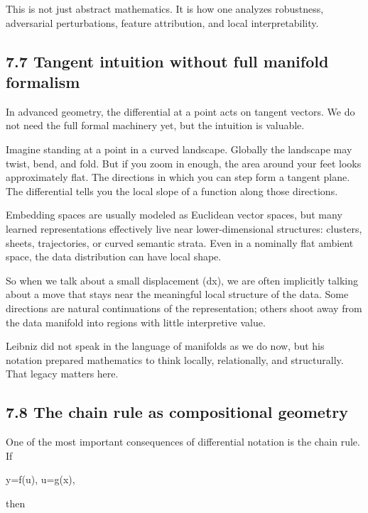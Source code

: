\documentclass[
]{article}
\begin{document}
This is not just abstract mathematics. It is how one analyzes
robustness, adversarial perturbations, feature attribution, and local
interpretability.

\hypertarget{tangent-intuition-without-full-manifold-formalism}{%
\subsection{7.7 Tangent intuition without full manifold
formalism}\label{tangent-intuition-without-full-manifold-formalism}}

In advanced geometry, the differential at a point acts on tangent
vectors. We do not need the full formal machinery yet, but the intuition
is valuable.

Imagine standing at a point in a curved landscape. Globally the
landscape may twist, bend, and fold. But if you zoom in enough, the area
around your feet looks approximately flat. The directions in which you
can step form a tangent plane. The differential tells you the local
slope of a function along those directions.

Embedding spaces are usually modeled as Euclidean vector spaces, but
many learned representations effectively live near lower-dimensional
structures: clusters, sheets, trajectories, or curved semantic strata.
Even in a nominally flat ambient space, the data distribution can have
local shape.

So when we talk about a small displacement (dx), we are often implicitly
talking about a move that stays near the meaningful local structure of
the data. Some directions are natural continuations of the
representation; others shoot away from the data manifold into regions
with little interpretive value.

Leibniz did not speak in the language of manifolds as we do now, but his
notation prepared mathematics to think locally, relationally, and
structurally. That legacy matters here.

\hypertarget{the-chain-rule-as-compositional-geometry}{%
\subsection{7.8 The chain rule as compositional
geometry}\label{the-chain-rule-as-compositional-geometry}}

One of the most important consequences of differential notation is the
chain rule. If

y=f(u), \qquad u=g(x),

then
\end{document}
